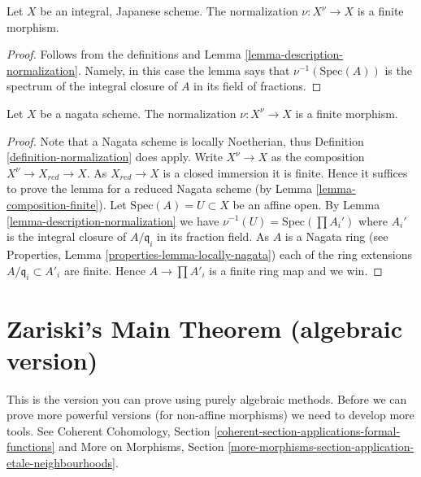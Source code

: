 \begin{lemma}
\label{lemma-Japanese-normalization}
Let $X$ be an integral, Japanese scheme.
The normalization $\nu : X^\nu \to X$ is a finite morphism.
\end{lemma}

\begin{proof}
Follows from the definitions and
Lemma \ref{lemma-description-normalization}. Namely, in this case
the lemma says that $\nu^{-1}(\text{Spec}(A))$ is the spectrum
of the integral closure of $A$ in its field of fractions.
\end{proof}

\begin{lemma}
\label{lemma-nagata-normalization}
Let $X$ be a nagata scheme.
The normalization $\nu : X^\nu \to X$ is a finite morphism.
\end{lemma}

\begin{proof}
Note that a Nagata scheme is locally Noetherian, thus
Definition \ref{definition-normalization}
does apply. Write $X^\nu \to X$ as the composition
$X^\nu \to X_{red} \to X$. As $X_{red} \to X$ is a closed immersion
it is finite. Hence it suffices to prove the lemma for a reduced
Nagata scheme (by Lemma \ref{lemma-composition-finite}).
Let $\text{Spec}(A) = U \subset X$ be an affine open.
By Lemma \ref{lemma-description-normalization} we have
$\nu^{-1}(U) = \text{Spec}(\prod A_i')$ where $A_i'$ is the integral
closure of $A/\mathfrak q_i$ in its fraction field. As $A$ is a Nagata
ring (see Properties, Lemma \ref{properties-lemma-locally-nagata})
each of the ring extensions
$A/\mathfrak q_i \subset A'_i$ are finite. Hence $A \to \prod A'_i$
is a finite ring map and we win.
\end{proof}








\section{Zariski's Main Theorem (algebraic version)}
\label{section-Zariski}

\noindent
This is the version you can prove using purely algebraic methods.
Before we can prove more powerful versions (for non-affine morphisms)
we need to develop more tools. See
Coherent Cohomology,
Section \ref{coherent-section-applications-formal-functions}
and
More on Morphisms,
Section \ref{more-morphisms-section-application-etale-neighbourhoods}.

